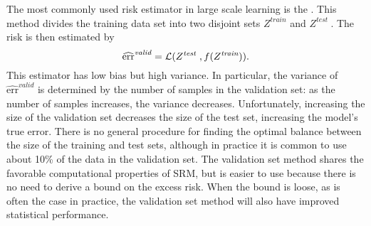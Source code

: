 \documentclass[thesis.tex]{subfiles}
\newcommand{\riskstar}{{\textrm{err}^*}}
\newcommand{\riskvalid}{\widehat{\textrm{err}}^\textit{valid}}
\begin{document}
\newcommand{\Ztrain}{Z^\textit{train}}
\newcommand{\Ztest }{Z^\textit{test }}
\newcommand{\ntrain}{n^\textit{train}}
\newcommand{\ntest }{n^\textit{test }}
The most commonly used risk estimator in large scale learning is the 
\citep[Chapter 11 of ][]{shalev2014understanding}.
This method divides the training data set into two disjoint sets $\Ztrain$ and $\Ztest$.
The risk is then estimated by
\begin{equation}
    \riskvalid = \Loss(\Ztest,f(\Ztrain))
    .
\end{equation}
This estimator has low bias but high variance.
In particular, the variance of $\riskvalid$ is determined by the number of samples in the validation set:
as the number of samples increases, the variance decreases.
Unfortunately, increasing the size of the validation set decreases the size of the test set,
increasing the model's true error.
There is no general procedure for finding the optimal balance between the size of the training and test sets,
although in practice it is common to use about 10\% of the data in the validation set.
The validation set method shares the favorable computational properties of SRM,
but is easier to use because there is no need to derive a bound on the excess risk.
When the bound is loose, as is often the case in practice, the validation set method will also have improved statistical performance.
\end{document}
